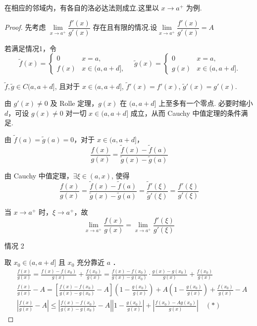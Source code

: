 在相应的邻域内，有各自的洛必达法则成立.这里以 $x \to a^+$ 为例.
\begin{proof}
	先考虑 $\lim\limits_{x \to a^+} \dfrac{f'(x)}{g'(x)}$ 存在且有限的情况.设$\lim\limits_{x \to a^+} \dfrac{f'(x)}{g'(x)}=A$
	
	若满足情况1，令
	\[
	\ \widetilde{f}(x) = \begin{cases}
		0 & x = a, \\
		f(x) & x \in (a, a+d],
	\end{cases}
	\quad
	\widetilde{g}(x) = \begin{cases}
		0 & x = a, \\
		g(x) & x \in (a, a+d].
	\end{cases}
	\]
	
	$\widetilde{f}, \widetilde{g}\in C(a, a+d]$, 且对于 $x \in (a, a+d]$, $\widetilde{f}'(x) = f'(x)$, $\widetilde{g}'(x) = g'(x)$.
	
	由 $g'(x) \neq 0$ 及 Rolle 定理，$g(x)$ 在 $(a, a+d]$ 上至多有一个零点.
	必要时缩小 $d$，可设 $g(x) \neq 0$ 对一切 $x \in (a, a+d]$ 成立，从而 Cauchy 中值定理的条件满足.
	
	由 $\widetilde{f}(a) = \widetilde{g}(a) = 0$，对于 $x \in (a, a+d]$，
	\[
	\frac{f(x)}{g(x)} = \frac{\widetilde{f}(x) - \widetilde{f}(a)}{\widetilde{g}(x) - \widetilde{g}(a)}
	\]
	
	由 Cauchy 中值定理，$\exists \xi \in (a, x)$, 使得
	\[
	\frac{f(x)}{g(x)} = \frac{\widetilde{f}(x) - \widetilde{f}(a)}{\widetilde{g}(x) - \widetilde{g}(a)} = \frac{\widetilde{f}'(\xi)}{\widetilde{g}'(\xi)} = \frac{f'(\xi)}{g'(\xi)}
	\]
	
	当 $x \to a^+$ 时，$\xi \to a^+$，故
	\[
	\lim_{x \to a^+} \frac{f(x)}{g(x)} = \lim_{x \to a^+} \frac{f'(\xi)}{g'(\xi)}
	\]
	
	情况 2
	
	取 $x_0 \in(a, a+d]$ 且 $x_0$ 充分靠近 $a$ ．
	$$
	\begin{aligned}
		&\frac{f(x)}{g(x)}=\frac{f(x)-f\left(x_0\right)}{g(x)}+\frac{f\left(x_0\right)}{g(x)}=\frac{f(x)-f\left(x_0\right)}{g(x)-g\left(x_0\right)} \cdot \frac{g(x)-g\left(x_0\right)}{g(x)}+\frac{f\left(x_0\right)}{g(x)} \\
		&\frac{f(x)}{g(x)}-A=\left[\frac{f(x)-f\left(x_0\right)}{g(x)-g\left(x_0\right)}-A\right]\left(1-\frac{g\left(x_0\right)}{g(x)}\right)+A\left(1-\frac{g\left(x_0\right)}{g(x)}\right)+\frac{f\left(x_0\right)}{g(x)}-A \\
		&\left|\frac{f(x)}{g(x)}-A\right| \leqslant\left|\frac{f(x)-f\left(x_0\right)}{g(x)-g\left(x_0\right)}-A\right|\left|1-\frac{g\left(x_0\right)}{g(x)}\right|+\left|\frac{f\left(x_0\right)-A g\left(x_0\right)}{g(x)}\right|\quad(*)
	\end{aligned}
	$$
	

\end{proof}
